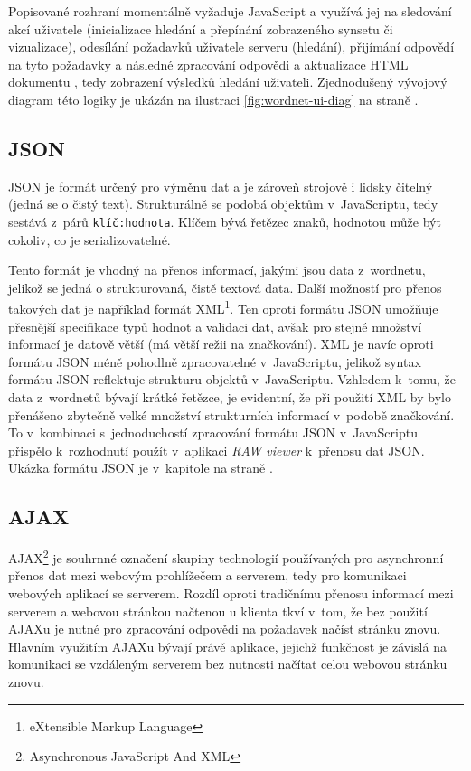\documentclass[a4paper, 11pt, oneside, showtrims]{book}
\newcommand{\simplywn}{\textit{RAW viewer} }
\newcommand{\itNameRef}[1]{\textit{\nameref{#1}}}
\begin{document}
				Popisované rozhraní momentálně vyžaduje JavaScript a využívá jej na sledování akcí uživatele (inicializace hledání a přepínání zobrazeného synsetu či vizualizace), odesílání požadavků uživatele serveru (hledání), přijímání odpovědí na tyto požadavky a následné zpracování odpovědi a aktualizace HTML dokumentu%
				, tedy zobrazení výsledků hledání uživateli. %
				Zjednodušený vývojový diagram této logiky je ukázán na ilustraci \ref{fig:wordnet-ui-diag} na straně \pageref{fig:wordnet-ui-diag}.

				\subsection{JSON}
				\label{cha:json}

					JSON je formát určený pro výměnu dat a je zároveň strojově i lidsky čitelný (jedná se o čistý text). Strukturálně se podobá objektům v~JavaScriptu, tedy sestává z~párů \texttt{klíč:hodnota}. Klíčem bývá řetězec znaků, hodnotou může být cokoliv, co je serializovatelné. \parencite{jsonDoc}

					Tento formát je vhodný na přenos informací, jakými jsou data z~wordnetu, jelikož se jedná o strukturovaná, čistě textová data. Další možností pro přenos takových dat je například formát XML\footnote{eXtensible Markup Language}. Ten oproti formátu JSON umožňuje přesnější specifikace typů hodnot a validaci dat, avšak pro stejné množství informací je datově větší (má větší režii na značkování). XML je navíc oproti formátu JSON méně pohodlně zpracovatelné v~JavaScriptu, jelikož syntax formátu JSON reflektuje strukturu objektů v~JavaScriptu. Vzhledem k~tomu, že data z~wordnetů bývají krátké řetězce, je evidentní, že při použití XML by bylo přenášeno zbytečně velké množství strukturních informací v~podobě značkování. \parencite{jsonVsXML} To v~kombinaci s~jednoduchostí zpracování formátu JSON v~JavaScriptu přispělo k~rozhodnutí použít v~aplikaci \simplywn k~přenosu dat JSON. Ukázka formátu JSON je v~kapitole \itNameRef{cha:answerStruct} na straně \pageref{cha:answerStruct}.

				\subsection{AJAX}

					AJAX\footnote{Asynchronous JavaScript And XML} je souhrnné označení skupiny technologií používaných pro asynchronní přenos dat mezi webovým prohlížečem a serverem, tedy pro komunikaci webových aplikací se serverem. Rozdíl oproti tradičnímu přenosu informací mezi serverem a webovou stránkou načtenou u klienta tkví v~tom, že bez použití AJAXu je nutné pro zpracování odpovědi na požadavek načíst stránku znovu. Hlavním využitím AJAXu bývají právě aplikace, jejichž funkčnost je závislá na komunikaci se vzdáleným serverem bez nutnosti načítat celou webovou stránku znovu. \parencite{garrett2005ajax}
\end{document}
